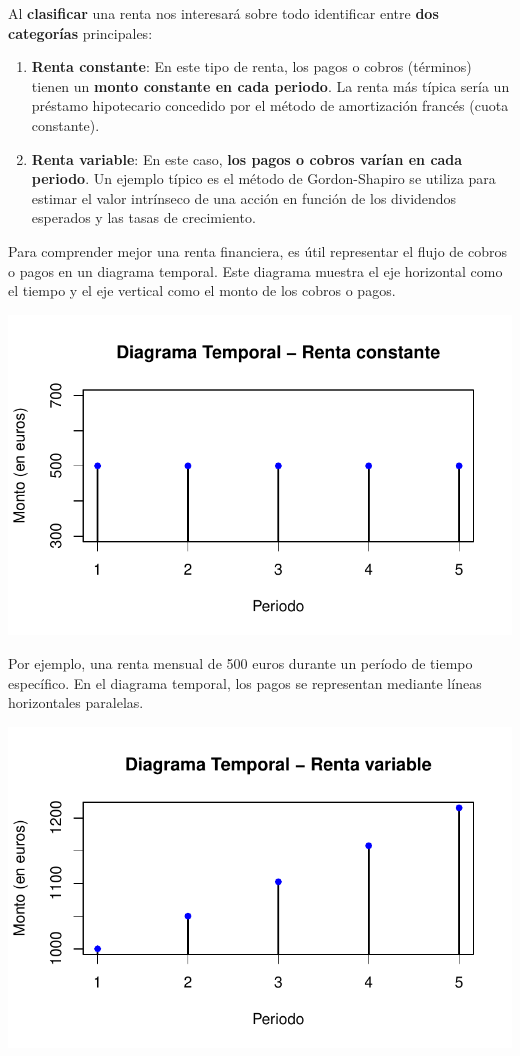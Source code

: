 \documentclass[
  letterpaper,
  DIV=11,
  numbers=noendperiod]{scrartcl}
\begin{document}
Al \textbf{clasificar} una renta nos interesará sobre todo identificar
entre \textbf{dos categorías} principales:

\begin{enumerate}
\def\labelenumi{\arabic{enumi}.}
\item
  \textbf{Renta constante}: En este tipo de renta, los pagos o cobros
  (términos) tienen un \textbf{monto constante en cada periodo}. La
  renta más típica sería un préstamo hipotecario concedido por el método
  de amortización francés (cuota constante).
\item
  \textbf{Renta variable}: En este caso, \textbf{los pagos o cobros
  varían en cada periodo}. Un ejemplo típico es el método de
  Gordon-Shapiro se utiliza para estimar el valor intrínseco de una
  acción en función de los dividendos esperados y las tasas de
  crecimiento.
\end{enumerate}

Para comprender mejor una renta financiera, es útil representar el flujo
de cobros o pagos en un diagrama temporal. Este diagrama muestra el eje
horizontal como el tiempo y el eje vertical como el monto de los cobros
o pagos.

\includegraphics{2023-CLASES-MARTA_files/figure-pdf/unnamed-chunk-1-1.pdf}

Por ejemplo, una renta mensual de 500 euros durante un período de tiempo
específico. En el diagrama temporal, los pagos se representan mediante
líneas horizontales paralelas.

\includegraphics{2023-CLASES-MARTA_files/figure-pdf/unnamed-chunk-2-1.pdf}
\end{document}
